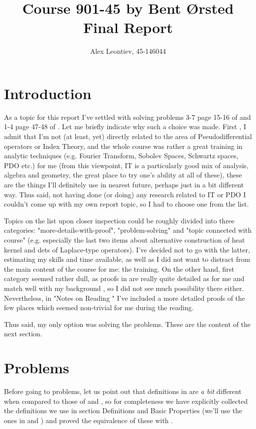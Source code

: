 \documentclass[10pt]{article} %
\title{Course 901-45 by Bent Ørsted\\Final Report}
\author{Alex Leontiev, 45-146044}
\begin{document}
\begin{CJK}{UTF8}{bsmi}
\maketitle
\end{CJK}
\section{Introduction}
As a topic for this report I've settled with solving problems 3-7 page 15-16 of \cite{met-sobolev}
and 1-4 page 47-48 of \cite{met-fa}. Let me briefly indicate why such a choice was made. First
, I admit that I'm not (at least, yet) directly related to the area of Pseudodifferential operators or Index Theory, and the whole
course was rather a great training in analytic techniques (e.g. Fourier Transform, Sobolev Spaces, Schwartz spaces, PDO etc.) for me
(from this viewpoint, IT is a particularly good mix of analysis, algebra and geometry, the great place to try one's ability at all
of these), these are the things I'll definitely use in nearest future, perhaps just in a bit different way. Thus said, not having
done (or doing) any research related to IT or PDO I couldn't come up with my own report topic, so I had to choose one from the list.

Topics on the list upon closer inspection could be roughly divided into three categories: "more-details-with-proof", "problem-solving"
and "topic connected with course" (e.g. especially the last two items about alternative construction of heat kernel and dets of
Laplace-type operators). I've decided not to go with the latter, estimating my skills and time available, as well as I did not want
to distract from the main content of the course for me: the training. On the other hand, first category seemed rather dull, as
proofs in \cite{gilkey} are really quite detailed as for me and match well with my background
, so I did not see much possibility there either. Nevertheless, in "Notes
on Reading \cite{gilkey}" I've included a more detailed proofs of the few places which seemed non-trivial for me during the reading.

Thus said, my only option was solving the problems. These are the content of the next section.
\section{Problems}
Before going to problems, let us point out that definitions in \cite{gilkey} are {\it a bit} different when compared to those
of \cite{met-sobolev} and \cite{met-fa}, so for completeness we have explicitly 
collected the definitions we use in section Definitions and
Basic Properties (we'll use the ones in \cite{met-fa} and \cite{met-sobolev}) and proved the equivalence of these with \cite{gilkey}.
\end{document}
